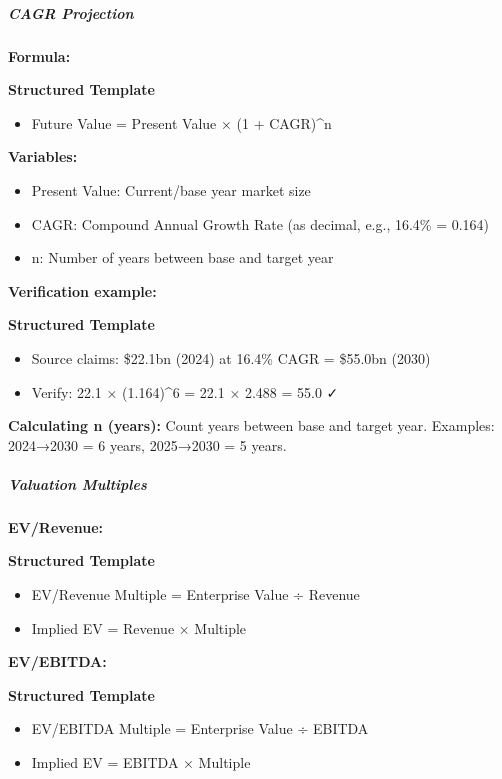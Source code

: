 \documentclass[11pt]{article}
\begin{document}
\subparagraph{CAGR Projection}\mbox{}\par

\textbf{Formula:}

\textbf{Structured Template}
\begin{itemize}[leftmargin=*,itemsep=2pt,topsep=2pt]
\item {} Future Value = Present Value × (1 + CAGR)\textasciicircum{}n
\end{itemize}

\textbf{Variables:}

\begin{itemize}[leftmargin=*,itemsep=2pt,topsep=2pt]
\item {} Present Value: Current/base year market size
\item {} CAGR: Compound Annual Growth Rate (as decimal, e.g., 16.4\% = 0.164)
\item {} n: Number of years between base and target year
\end{itemize}

\textbf{Verification example:}

\textbf{Structured Template}
\begin{itemize}[leftmargin=*,itemsep=2pt,topsep=2pt]
\item {} Source claims: \$22.1bn (2024) at 16.4\% CAGR = \$55.0bn (2030)
\item {} Verify: 22.1 × (1.164)\textasciicircum{}6 = 22.1 × 2.488 = 55.0 ✓
\end{itemize}

\textbf{Calculating n (years):} Count years between base and target year. Examples: 2024→2030 = 6 years, 2025→2030 = 5 years.


\subparagraph{Valuation Multiples}\mbox{}\par

\textbf{EV/Revenue:}

\textbf{Structured Template}
\begin{itemize}[leftmargin=*,itemsep=2pt,topsep=2pt]
\item {} EV/Revenue Multiple = Enterprise Value ÷ Revenue
\item {} Implied EV = Revenue × Multiple
\end{itemize}

\textbf{EV/EBITDA:}

\textbf{Structured Template}
\begin{itemize}[leftmargin=*,itemsep=2pt,topsep=2pt]
\item {} EV/EBITDA Multiple = Enterprise Value ÷ EBITDA
\item {} Implied EV = EBITDA × Multiple
\end{itemize}
\end{document}
